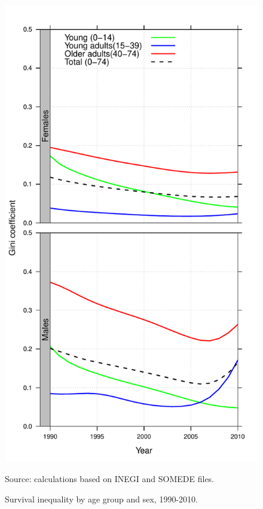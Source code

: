 \documentclass[11.5pt]{article}
\begin{document}
\begin{spacing}{1.5}
\begin{figure}
\centering
\caption{Survival inequality by age group and sex, 1990-2010.}
\label{fig:Gini}
\includegraphics[scale=.5]{Figures/Gini_fig.pdf}

 Source: calculations based on INEGI and SOMEDE files.
\end{figure}




\end{spacing}
\end{document}
